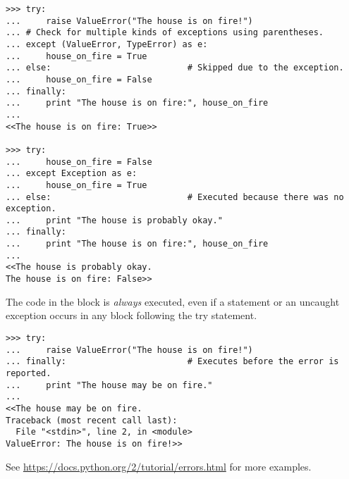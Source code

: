 
\begin{lstlisting}
>>> try:
...     raise ValueError("The house is on fire!")
... # Check for multiple kinds of exceptions using parentheses.
... except (ValueError, TypeError) as e:
...     house_on_fire = True
... else:                           # Skipped due to the exception.
...     house_on_fire = False
... finally:
...     print "The house is on fire:", house_on_fire
...
<<The house is on fire: True>>

>>> try:
...     house_on_fire = False
... except Exception as e:
...     house_on_fire = True
... else:                           # Executed because there was no exception.
...     print "The house is probably okay."
... finally:
...     print "The house is on fire:", house_on_fire
...
<<The house is probably okay.
The house is on fire: False>>
\end{lstlisting}

The code in the  block is \emph{always} executed, even if a  statement or an uncaught exception occurs in any block following the try statement.

\begin{lstlisting}
>>> try:
...     raise ValueError("The house is on fire!")
... finally:                        # Executes before the error is reported.
...     print "The house may be on fire."
...
<<The house may be on fire.
Traceback (most recent call last):
  File "<stdin>", line 2, in <module>
ValueError: The house is on fire!>>
\end{lstlisting}

See \url{https://docs.python.org/2/tutorial/errors.html} for more examples.

